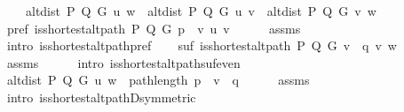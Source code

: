 \begin{isabellebody}
\ \ \ \ {\isachardoublequoteopen}alt{\isacharunderscore}{\kern0pt}dist\ P\ Q\ G\ u\ w\ {\isacharequal}{\kern0pt}\ alt{\isacharunderscore}{\kern0pt}dist\ P\ Q\ G\ u\ v\ {\isacharplus}{\kern0pt}\ alt{\isacharunderscore}{\kern0pt}dist\ P\ Q\ G\ v\ w{\isachardoublequoteclose}%
\endisataginvisible
{\isafoldinvisible}%
%
\isadeliminvisible
\isanewline
%
\endisadeliminvisible
%
\isadelimproof
%
\endisadelimproof
%
\isatagproof
{}\isamarkupfalse%
\ {\isacharminus}{\kern0pt}\isanewline
\ \ \isamarkupfalse%
\ pref{\isacharcolon}{\kern0pt}\ {\isachardoublequoteopen}is{\isacharunderscore}{\kern0pt}shortest{\isacharunderscore}{\kern0pt}alt{\isacharunderscore}{\kern0pt}path\ P\ Q\ G\ {\isacharparenleft}{\kern0pt}p\ {\isacharat}{\kern0pt}\ {\isacharbrackleft}{\kern0pt}v{\isacharbrackright}{\kern0pt}{\isacharparenright}{\kern0pt}\ u\ v{\isachardoublequoteclose}\isanewline
\ \ \ \ \isamarkupfalse%
\ assms{\isacharparenleft}{\kern0pt}{}{\isacharcomma}{\kern0pt}\ {}{\isacharparenright}{\kern0pt}\isanewline
\ \ \ \ \isamarkupfalse%
\ {\isacharparenleft}{\kern0pt}intro\ is{\isacharunderscore}{\kern0pt}shortest{\isacharunderscore}{\kern0pt}alt{\isacharunderscore}{\kern0pt}path{\isacharunderscore}{\kern0pt}pref{\isacharparenright}{\kern0pt}\isanewline
\ \ \isamarkupfalse%
\ suf{\isacharcolon}{\kern0pt}\ {\isachardoublequoteopen}is{\isacharunderscore}{\kern0pt}shortest{\isacharunderscore}{\kern0pt}alt{\isacharunderscore}{\kern0pt}path\ P\ Q\ G\ {\isacharparenleft}{\kern0pt}v\ {\isacharhash}{\kern0pt}\ q{\isacharparenright}{\kern0pt}\ v\ w{\isachardoublequoteclose}\isanewline
\ \ \ \ \isamarkupfalse%
\ assms\isanewline
\ \ \ \ \isamarkupfalse%
\ {\isacharparenleft}{\kern0pt}intro\ is{\isacharunderscore}{\kern0pt}shortest{\isacharunderscore}{\kern0pt}alt{\isacharunderscore}{\kern0pt}path{\isacharunderscore}{\kern0pt}suf{\isacharunderscore}{\kern0pt}even{\isacharparenright}{\kern0pt}\isanewline
\ \ \isamarkupfalse%
\ {\isachardoublequoteopen}alt{\isacharunderscore}{\kern0pt}dist\ P\ Q\ G\ u\ w\ {\isacharequal}{\kern0pt}\ path{\isacharunderscore}{\kern0pt}length\ {\isacharparenleft}{\kern0pt}p\ {\isacharat}{\kern0pt}\ v\ {\isacharhash}{\kern0pt}\ q{\isacharparenright}{\kern0pt}{\isachardoublequoteclose}\isanewline
\ \ \ \ \isamarkupfalse%
\ assms{\isacharparenleft}{\kern0pt}{}{\isacharparenright}{\kern0pt}\isanewline
\ \ \ \ \isamarkupfalse%
\ {\isacharparenleft}{\kern0pt}intro\ is{\isacharunderscore}{\kern0pt}shortest{\isacharunderscore}{\kern0pt}alt{\isacharunderscore}{\kern0pt}pathD{\isacharparenleft}{\kern0pt}{}{\isacharparenright}{\kern0pt}{\isacharbrackleft}{\kern0pt}symmetric{\isacharbrackright}{\kern0pt}{\isacharparenright}{\kern0pt}\isanewline

\end{isabellebody}
